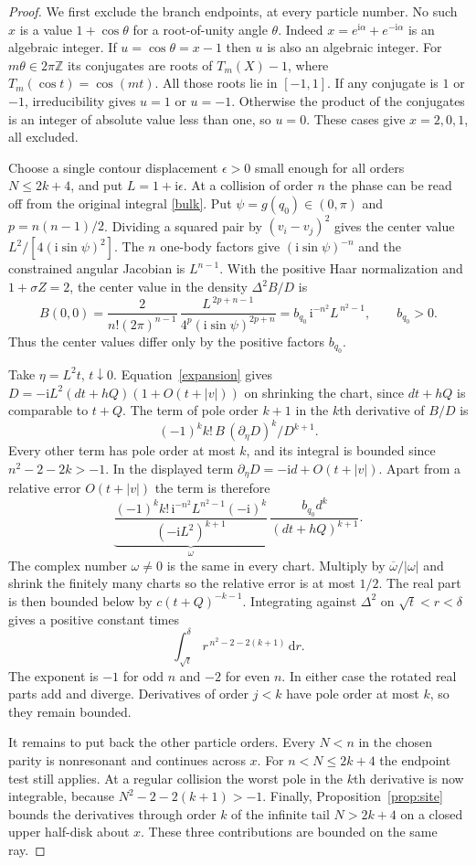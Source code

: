 \documentclass[11pt]{article}
\newcommand{\ii}{\mathrm i}
\newcommand{\dd}{\,\mathrm d}
\newcommand{\Z}{\mathbb Z}
\begin{document}
\begin{proof}
We first exclude the branch endpoints, at every particle number.
No such $x$ is a value $1+\cos\theta$ for a root-of-unity
angle $\theta$. Indeed $x=e^{\ii\alpha}+e^{-\ii\alpha}$ is an algebraic
integer. If $u=\cos\theta=x-1$ then $u$ is also an algebraic integer.
For $m\theta\in2\pi\Z$ its conjugates are roots of $T_m(X)-1$, where
$T_m(\cos t)=\cos(mt)$. All those roots lie in $[-1,1]$.
If any conjugate is $1$ or $-1$, irreducibility gives $u=1$ or
$u=-1$. Otherwise the product of the conjugates is an integer of
absolute value less than one, so $u=0$. These cases give $x=2,0,1$,
all excluded.

Choose a single contour displacement $\epsilon>0$ small enough for all
orders $N\le 2k+4$, and put $L=1+\ii\epsilon$.
At a collision of order $n$ the phase can be read off from the
original integral \eqref{bulk}. Put $\psi=g(q_0)\in(0,\pi)$ and
$p=n(n-1)/2$. Dividing a squared pair by $(v_i-v_j)^2$ gives the
center value $L^2/[4(\ii\sin\psi)^2]$. The $n$ one-body factors
give $(\ii\sin\psi)^{-n}$ and the constrained angular Jacobian is
$L^{n-1}$. With the positive Haar normalization and
$1+\sigma Z=2$, the center value in the density $\Delta^2 B/D$ is
\[
 B(0,0)=
 \frac{2}{n!(2\pi)^{n-1}}\,
 \frac{L^{\,2p+n-1}}{4^p(\ii\sin\psi)^{2p+n}}
 = b_{q_0}\,\ii^{-n^2}L^{\,n^2-1},\qquad b_{q_0}>0 .
\]
Thus the center values differ only by the positive factors $b_{q_0}$.

Take $\eta=L^2t$, $t\downarrow0$. Equation~\eqref{expansion} gives
$D=-\ii L^2(dt+hQ)(1+O(t+|v|))$ on shrinking the chart, since
$dt+hQ$ is comparable to $t+Q$. The term of pole order $k+1$ in
the $k$th derivative of $B/D$ is
\[
 (-1)^k k!\,B\,(\partial_\eta D)^k/D^{k+1}.
\]
Every other term has pole order at most $k$, and its integral is
bounded since $n^2-2-2k>-1$.
In the displayed term $\partial_\eta D=-\ii d+O(t+|v|)$. Apart from
a relative error $O(t+|v|)$ the term is therefore
\[
 \underbrace{\frac{(-1)^k k!\,\ii^{-n^2}L^{n^2-1}(-\ii)^k}
                    {(-\ii L^2)^{k+1}}}_{\displaystyle\omega}\,
 \frac{b_{q_0}d^k}{(dt+hQ)^{k+1}} .
\]
The complex number $\omega\ne0$ is the same in every chart. Multiply
by $\overline\omega/|\omega|$ and shrink the finitely many charts
so the relative error is at most $1/2$. The real part is then bounded
below by $c(t+Q)^{-k-1}$. Integrating against $\Delta^2$ on
$\sqrt t<r<\delta$ gives a positive constant times
\[
 \int_{\sqrt t}^\delta r^{\,n^2-2-2(k+1)}\dd r .
\]
The exponent is $-1$ for odd $n$ and $-2$ for even $n$. In either
case the rotated real parts add and diverge. Derivatives of order
$j<k$ have pole order at most $k$, so they remain bounded.

It remains to put back the other particle orders. Every $N<n$ in the
chosen parity is nonresonant and continues across $x$. For
$n<N\le2k+4$ the endpoint test still applies. At a regular collision
the worst pole in the $k$th derivative is now integrable, because
$N^2-2-2(k+1)>-1$. Finally, Proposition~\ref{prop:site} bounds the
derivatives through order $k$ of the infinite tail $N>2k+4$ on a
closed upper half-disk about $x$.
These three contributions are bounded on the same ray.
\end{proof}
\end{document}

